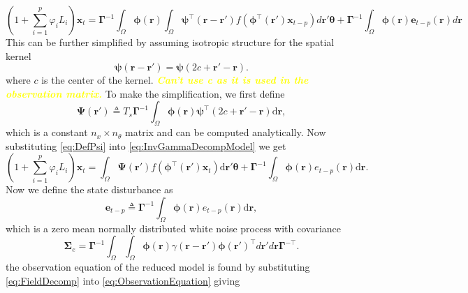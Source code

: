 \documentclass[a4paper,10pt]{article}
\newcommand{\dean}[1]{\textsf{\emph{\textbf{\textcolor{yellow}{#1}}}}}
\begin{document}
\begin{equation}\label{eq:InvGammaDecompModel}
 (1+\sum_{i=1}^{p}\varphi_i L_i) \mathbf{x}_t=\boldsymbol\Gamma^{-1}\int_{\Omega}\boldsymbol \phi(\mathbf r)\int_{\Omega}\boldsymbol{\psi}^\top\left(\mathbf{r}-\mathbf{r}'\right) f(\boldsymbol{\phi}^{\top}\left(\mathbf{r'}\right) \mathbf{x}_{t-p})d\mathbf r'\boldsymbol{\theta}+\boldsymbol\Gamma^{-1}\int_{\Omega}\boldsymbol\phi(\mathbf r)\mathbf e_{t-p}(\mathbf r)d\mathbf r
\end{equation}
This can be further simplified by assuming isotropic structure for the spatial kernel
\begin{equation}
	\boldsymbol{\psi} (\mathbf{r}-\mathbf{r}') = \boldsymbol{\psi} (2c+\mathbf{r}'-\mathbf{r}).
\end{equation}
where $c$ is the center of the kernel. \dean{Can't use c as it is used in the observation matrix.} To make the simplification, we first define
\begin{equation}\label{eq:DefPsi}
	\boldsymbol{\Psi}(\mathbf{r}') \triangleq T_s\boldsymbol{\Gamma}^{-1}\int_\Omega {\boldsymbol{\phi}(\mathbf{r})\boldsymbol{\psi}^{\top} (2c+\mathbf{r}'-\mathbf{r})\textrm{d}\mathbf{r}},
\end{equation}
which is a constant $n_x \times n_{\theta}$ matrix and can be computed analytically. Now substituting \eqref{eq:DefPsi} into \eqref{eq:InvGammaDecompModel} we get
\begin{equation}
(1+\sum_{i=1}^{p}\varphi_i L_i) \mathbf{x}_t = \int_\Omega \boldsymbol{\Psi}(\mathbf{r}') f(\boldsymbol{\phi}^{\top}(\mathbf{r}')\mathbf{x}_t) \textrm{d}\mathbf{r}' \boldsymbol{\theta}
+ \boldsymbol{\Gamma}^{-1} \int_\Omega{\boldsymbol{\phi}(\mathbf{r})e_{t-p}(\mathbf{r})\textrm{d}\mathbf{r}}.
\end{equation}
Now we define the state disturbance as
\begin{equation}\label{eq:Wt} 
	\mathbf{e}_{t-p} \triangleq \boldsymbol{\Gamma}^{-1}\int_\Omega {\boldsymbol{\phi} ( \mathbf{r} )e_{t-p}( \mathbf{r} )\textrm{d}\mathbf{r}},
\end{equation}
which is a zero mean normally distributed white noise process with covariance
\begin{equation}
	\boldsymbol\Sigma_e =\mathbf{\Gamma}^{-1}\int_{\Omega}\int_{\Omega}\boldsymbol{\phi}\left(\mathbf r\right) \gamma\left(\mathbf r- \mathbf r' \right)\boldsymbol{\phi}\left(\mathbf r'\right)^{\top}d\mathbf r' d\mathbf r\mathbf{\Gamma}^{- \top}. 
\end{equation}
the observation equation of the reduced model is found by substituting \eqref{eq:FieldDecomp} into \eqref{eq:ObservationEquation} giving
\end{document}
